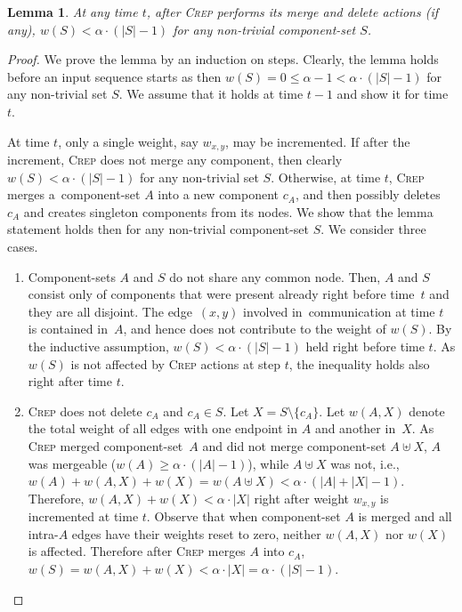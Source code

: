 \documentclass[11pt,a4paper]{scrartcl}
\newtheorem{lemma}[theorem]{Lemma}
\newcommand{\CREP}{\textsc{Crep}\xspace}
\begin{document}
\begin{lemma}
\label{lem:wS_bound}
At any time $t$, after \CREP performs its merge and delete actions (if any),
$w(S) < \alpha \cdot (|S|-1)$ for any non-trivial component-set $S$.
\end{lemma}

\begin{proof}
We prove the lemma by an induction on steps. Clearly, the lemma holds before an
input sequence starts as then $w(S) = 0 \leq \alpha - 1 < \alpha \cdot
(|S|-1)$ for any non-trivial set $S$. We assume that it holds at time $t-1$
and show it for time $t$.

At time $t$, only a single weight, say $w_{x,y}$, may be incremented. If after
the increment, \CREP does not merge any component, then clearly $w(S) < \alpha
\cdot (|S|-1)$ for any non-trivial set $S$. Otherwise, at time $t$, \CREP
merges a~component-set $A$ into a new component $c_A$, and then possibly
deletes $c_A$ and creates singleton components from its nodes. We show that
the lemma statement holds then for any non-trivial component-set $S$. We
consider three cases.

\begin{enumerate}

\item Component-sets $A$ and $S$ do not share any common node. Then, $A$ and
$S$ consist only of components that were present already right before time~$t$
and they are all disjoint. The edge~$(x,y)$ involved in~communication at time
$t$ is contained in~$A$, and hence does not contribute to the weight of
$w(S)$. By the inductive assumption, $w(S) < \alpha \cdot (|S|-1)$ held right
before time $t$. As $w(S)$ is not affected by \CREP actions at step $t$, the
inequality holds also right after time $t$.

\item \CREP does not delete $c_A$ and $c_A \in S$. Let $X = S \setminus
\{c_A\}$. Let $w(A,X)$ denote the total weight of all edges with one endpoint
in $A$ and another in~$X$. As \CREP merged component-set~$A$ and did not merge
component-set $A \uplus X$, $A$ was mergeable ($w(A) \geq \alpha \cdot
(|A|-1)$), while $A \uplus X$ was not, i.e., $w(A) + w(A,X) + w(X) = w(A
\uplus X) < \alpha \cdot (|A|+|X|-1)$. Therefore, $w(A,X) + w(X) < \alpha
\cdot |X|$ right after weight $w_{x,y}$ is incremented at time $t$. Observe
that when component-set $A$ is merged and all intra-$A$ edges have their weights 
reset to zero, neither $w(A,X)$ nor $w(X)$ is affected.
Therefore after \CREP merges $A$ into $c_A$, $w(S) =
w(A,X) + w(X) < \alpha \cdot |X| = \alpha \cdot (|S| - 1)$.


\end{enumerate}
\end{proof}
\end{document}
